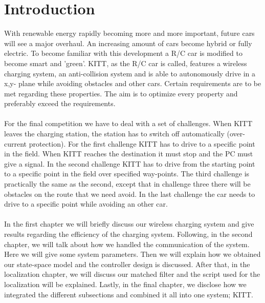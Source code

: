 \documentclass[final]{scrreprt} %
\begin{document}
\chapter{Introduction}
With renewable energy rapidly becoming more and more important, future cars will see a major overhaul. 
An increasing amount of cars become hybrid or fully electric. 
To become familiar with this development a R/C car is modified to become smart and 'green'.
KITT, as the R/C car is called, features a wireless charging system, an anti-collision system and is able to autonomously drive in a x,y- plane while avoiding obstacles and other cars.
Certain requirements are to be met regarding these properties. 
The aim is to optimize every property and preferably exceed the requirements.
\\\\
For the final competition we have to deal with a set of challenges. 
When KITT leaves the charging station, the station has to switch off automatically (over-current protection).
For the first challenge KITT has to drive to a specific point in the field. 
When KITT reaches the destination it must stop and the PC must give a signal. 
In the second challenge KITT has to drive from the starting point to a specific point in the field over specified way-points.
The third challenge is practically the same as the second, except that in challenge three there will be obstacles on the route that we need avoid.
In the last challenge the car needs to drive to a specific point while avoiding an other car. 
\\\\
In the first chapter we will briefly discuss our wireless charging system and give results regarding the efficiency of the charging system.
Following, in the second chapter, we will talk about how we handled the communication of the system. 
Here we will give some system parameters. 
Then we will explain how we obtained our state-space model and the controller design is discussed. 
After that, in the localization chapter, we will discuss our matched filter and the script used for the localization will be explained. 
Lastly, in the final chapter, we disclose how we integrated the different subsections and combined it all into one system; KITT.


\end{document}
